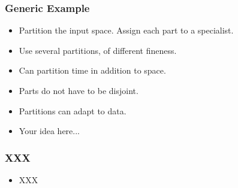 \documentclass{beamer}
\begin{document}
\begin{small}
\begin{frame}
\frametitle{Generic Example}
\begin{itemize}
\item Partition the input space. Assign each part to a specialist.
\item Use several partitions, of different fineness.
\item Can partition time in addition to space.
\item Parts do not have to be disjoint.
\item Partitions can adapt to data.
\item Your idea here...
\end{itemize}

\end{frame}
\begin{frame}
\frametitle{XXX}
\begin{itemize}
\item XXX
\end{itemize}
\end{frame}

\fi %
\end{small}
\end{document}
